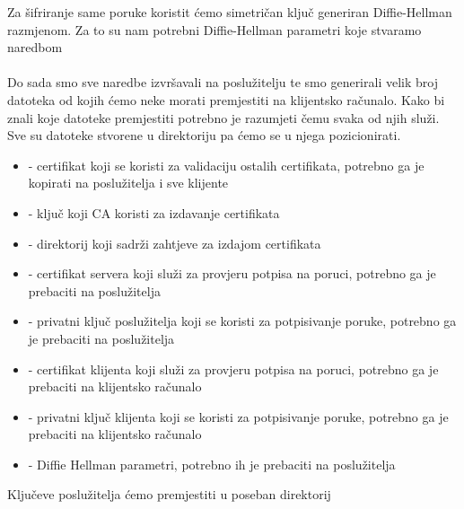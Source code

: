        \noindent
        Za šifriranje same poruke koristit ćemo simetričan ključ generiran
        Diffie-Hellman razmjenom. Za to su nam potrebni Diffie-Hellman
        parametri koje stvaramo naredbom \\

        \noindent
         \\


        \noindent
        Do sada smo sve naredbe izvršavali na poslužitelju te smo generirali
        velik broj datoteka od kojih ćemo neke morati premjestiti na klijentsko
        računalo. Kako bi znali koje datoteke premjestiti potrebno je razumjeti
        čemu svaka od njih služi. Sve su datoteke stvorene u
        direktoriju pa ćemo se u njega pozicionirati. \\

        \begin{itemize}
        \item {} - certifikat koji se koristi za validaciju ostalih
        certifikata, potrebno ga je kopirati na poslužitelja i sve klijente
        \item {} - ključ koji CA koristi za izdavanje certifikata
        \item {} - direktorij koji sadrži zahtjeve za izdajom
        certifikata 
        \item {} - certifikat servera koji služi za
        provjeru potpisa na poruci, potrebno ga je prebaciti na poslužitelja
        \item {} - privatni ključ poslužitelja
        koji se koristi za potpisivanje poruke, potrebno ga je prebaciti na
        poslužitelja
        \item {} - certifikat klijenta koji služi za
        provjeru potpisa na poruci, potrebno ga je prebaciti na klijentsko
        računalo
        \item {} - privatni ključ klijenta
        koji se koristi za potpisivanje poruke, potrebno ga je prebaciti na
        klijentsko računalo
        \item {} - Diffie Hellman parametri, potrebno ih je prebaciti na
        poslužitelja
        \end{itemize}

        \noindent
        Ključeve poslužitelja ćemo premjestiti u poseban direktorij \\

